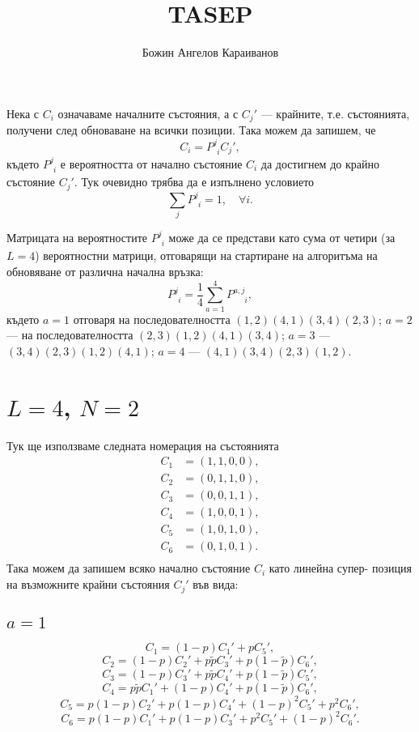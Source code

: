 \documentclass[english,bulgarian,a4paper,10pt]{article}
\author{Божин Ангелов Караиванов}
\title{TASEP}
\begin{document}
 \maketitle
Нека с $C_i$ означаваме началните състояния, а с $C_{j}'$ --- крайните,
т.е. състоянията, получени след обноваване на всички позиции.
Така можем да запишем, че
\begin{equation}
 C_i = P^{j}_{\phantom{j}i} C_{j}',
\end{equation}
където $P^{j}_{\phantom{j}i}$ е вероятността от начално състояние $C_{i}$
да достигнем до крайно състояние $C_{j}'$. Тук очевидно трябва да е изпълнено
условието
\begin{equation}
 \sum_{j} P^{j}_{\phantom{j}i} = 1,\quad\forall i.
\end{equation}

Матрицата на вероятностите $P^{j}_{\phantom{j}i}$ може да се представи като
сума от четири (за $L=4$) вероятностни матрици, отговарящи на стартиране на
алгоритъма на обновяване от различна начална връзка:
\begin{equation}
 P^{j}_{\phantom{j}i} = \frac{1}{4} \sum_{a=1}^{4} P^{a,j}_{\phantom{a,j}i},
\end{equation}
където $a=1$ отговаря на последователността $(1,2)(4,1)(3,4)(2,3)$; $a=2$ ---
на последователността $(2,3)(1,2)(4,1)(3,4)$; $a=3$ --- $(3,4)(2,3)(1,2)(4,1)$;
$a=4$ --- $(4,1)(3,4)(2,3)(1,2)$.


\section{$L=4$, $N=2$}
Тук ще използваме следната номерация на състоянията
\begin{equation}
\begin{split}
C_1 &= (1,1,0,0),\\
C_2 &= (0,1,1,0),\\
C_3 &= (0,0,1,1),\\
C_4 &= (1,0,0,1),\\
C_5 &= (1,0,1,0),\\
C_6 &= (0,1,0,1).\\
\end{split}
\end{equation}
Така можем да запишем всяко начално състояние $C_{i}$ като линейна супер- позиция
на възможните крайни състояния $C_{j}'$ във вида:

\subsection{$a=1$}
$$C_1 = (1-p) C_1' + p C_5',$$
$$C_2 = (1-p) C_2' + p\tilde{p} C_3' + p(1-\tilde{p}) C_6',$$
$$C_3 = (1-p) C_3' + p\tilde{p} C_4' + p(1-\tilde{p}) C_5',$$
$$C_4 = p\tilde{p} C_1' + (1-p) C_4' + p(1-\tilde{p}) C_6',$$
$$C_5 = p(1-p) C_2' + p(1-p) C_4' + (1-p)^2 C_5' + p^2 C_6',$$
$$C_6 = p(1-p) C_1' + p(1-p) C_3' + p^2 C_5' + (1-p)^2 C_6'.$$
\end{document}
